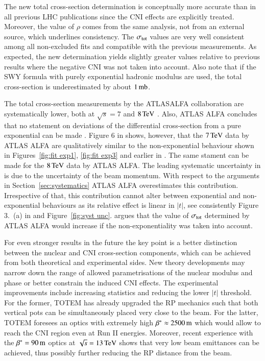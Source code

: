 The new total cross-section determination is conceptually more accurate than in all previous LHC publications since the CNI effects are explicitly treated. Moreover, the value of $\rho$ comes from the same analysis, not from an external source, which underlines consistency. The $\sigma_{\rm tot}$ values are very well consistent among all non-excluded fits and compatible with the previous measurements. As expected, the new determination yields slightly greater values relative to previous results where the negative CNI was not taken into account. Also note that if the SWY formula with purely exponential hadronic modulus are used, the total cross-section is underestimated by about $1\,{\rm mb}$.

\newpage
\hbox{}
\newpage

The total cross-section measurements by the ATLAS\Break ALFA collaboration are systematically lower, both at $\sqrt s = 7$ \cite{alfa-7tev} and $8\,{\rm TeV}$ \cite{alfa-8tev}. Also, ATLAS ALFA concludes that no statement on deviations of the differential cross-section from a pure exponential can be made \cite{alfa-8tev}. Figure 6 in \cite{block16} shows, however, that the $7\,{\rm TeV}$ data by ATLAS ALFA are qualitatively similar to the non-exponential behaviour shown in Figures~\ref{fig:fit exp1}, \ref{fig:fit exp3} and earlier in \cite{8tev-90m}. The same stament can be made for the $8\,{\rm TeV}$ data by ATLAS ALFA. The leading systematic uncertainty in \cite{alfa-8tev} is due to the uncertainty of the beam momentum. With respect to the arguments in Section~\ref{sec:systematics} ATLAS ALFA overestimates this contribution. Irrespective of that, this contribution cannot alter between exponential and non-exponential behaviours as its relative effect is linear in $|t|$, see consistently Figure 3.~(a) in \cite{alfa-8tev} and Figure~\ref{fig:syst unc}. \cite{block16} argues that the value of $\sigma_{\rm tot}$ determined by ATLAS ALFA would increase if the non-exponentiality was taken into account.

For even stronger results in the future the key point is a better distinction between the nuclear and CNI cross-section components, which can be achieved from both theoretical and experimental sides. New theory developments may narrow down the range of allowed parametrisations of the nuclear modulus and phase or better constrain the induced CNI effects. The experimental improvements include increasing statistics and reducing the lower $|t|$ threshold. For the former, TOTEM has already upgraded the RP mechanics such that both vertical pots can be simultaneously placed very close to the beam. For the latter, TOTEM foresees an optics with extremely high $\beta^* \approx 2500\,{\rm m}$ which would allow to reach the CNI region even at Run II energies. Moreover, recent experience with the $\beta^* = 90\,{\rm m}$ optics at $\sqrt s = 13\,{\rm TeV}$ shows that very low beam emittances can be achieved, thus possibly further reducing the RP distance from the beam.
